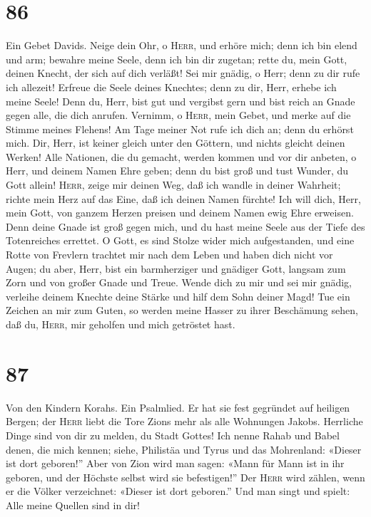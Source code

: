 \hypertarget{section-85}{%
\section{86}\label{section-85}}

 Ein Gebet Davids. Neige dein Ohr, o \textsc{Herr}, und
erhöre mich; denn ich bin elend und arm;  bewahre meine
Seele, denn ich bin dir zugetan; rette du, mein Gott, deinen Knecht, der
sich auf dich verläßt!  Sei mir gnädig, o Herr; denn zu
dir rufe ich allezeit!  Erfreue die Seele deines Knechtes;
denn zu dir, Herr, erhebe ich meine Seele!  Denn du, Herr,
bist gut und vergibst gern und bist reich an Gnade gegen alle, die dich
anrufen.  Vernimm, o \textsc{Herr}, mein Gebet, und merke
auf die Stimme meines Flehens!  Am Tage meiner Not rufe
ich dich an; denn du erhörst mich.  Dir, Herr, ist keiner
gleich unter den Göttern, und nichts gleicht deinen Werken!
 Alle Nationen, die du gemacht, werden kommen und vor dir
anbeten, o Herr, und deinem Namen Ehre geben;  denn du
bist groß und tust Wunder, du Gott allein! 
\textsc{Herr}, zeige mir deinen Weg, daß ich wandle in deiner Wahrheit;
richte mein Herz auf das Eine, daß ich deinen Namen fürchte!
 Ich will dich, Herr, mein Gott, von ganzem Herzen
preisen und deinem Namen ewig Ehre erweisen.  Denn deine
Gnade ist groß gegen mich, und du hast meine Seele aus der Tiefe des
Totenreiches errettet.  O Gott, es sind Stolze wider mich
aufgestanden, und eine Rotte von Frevlern trachtet mir nach dem Leben
und haben dich nicht vor Augen;  du aber, Herr, bist ein
barmherziger und gnädiger Gott, langsam zum Zorn und von großer Gnade
und Treue.  Wende dich zu mir und sei mir gnädig,
verleihe deinem Knechte deine Stärke und hilf dem Sohn deiner Magd!
 Tue ein Zeichen an mir zum Guten, so werden meine Hasser
zu ihrer Beschämung sehen, daß du, \textsc{Herr}, mir geholfen und mich
getröstet hast.

\hypertarget{section-86}{%
\section{87}\label{section-86}}

 Von den Kindern Korahs. Ein Psalmlied. Er hat sie fest
gegründet auf heiligen Bergen;  der \textsc{Herr} liebt
die Tore Zions mehr als alle Wohnungen Jakobs.  Herrliche
Dinge sind von dir zu melden, du Stadt Gottes!  Ich nenne
Rahab und Babel denen, die mich kennen; siehe, Philistäa und Tyrus und
das Mohrenland: «Dieser ist dort geboren!''  Aber von Zion
wird man sagen: «Mann für Mann ist in ihr geboren, und der Höchste
selbst wird sie befestigen!''  Der \textsc{Herr} wird
zählen, wenn er die Völker verzeichnet: «Dieser ist dort geboren.''
 Und man singt und spielt: Alle meine Quellen sind in dir!

